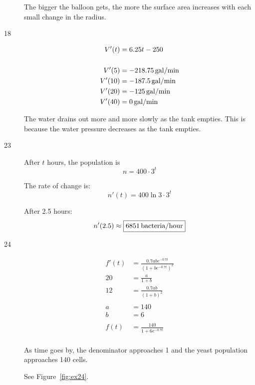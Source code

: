 \documentclass[letterpaper, landscape]{exam}
\begin{document}
\begin{description}
      The bigger the balloon gets, the more the surface area increases with each
      small change in the radius.

    \newpage

    \item[18]
      \begin{align*}
        V'(t)  & = 6.25t - 250 \\
        \\
        V'(5)  & = \unit[-218.75]{gal/min} \\
        V'(10) & = \unit[-187.5]{gal/min} \\
        V'(20) & = \unit[-125]{gal/min} \\
        V'(40) & = \unit[0]{gal/min} \\
      \end{align*}

      The water drains out more and more slowly as the tank empties. This is because
      the water pressure decreases as the tank empties.

    \item[23]
      After $t$ hours, the population is 
      \[
        n = 400 \cdot 3^t 
      \]

      The rate of change is:
      \[
        n'(t) = 400 \ln 3 \cdot 3^t
      \]

      After 2.5 hours:
      \[
        n'(2.5) \approx \boxed{ \unit[6851]{bacteria/hour} }
      \]

    \item[24]
      \begin{align*}
        f'(t) &= \frac{0.7abe^{ - 0.7 t}}{\left( 1 + be^{ - 0.7 t} \right)^2}
        \\
        20 &= \frac{a}{1 + b} \\
        12 &= \frac{0.7 ab}{\left( 1 + b \right)^2} \\
        \\
        a &= 140 \\
        b &= 6 \\
        \\
        f(t) &= \boxed{ \frac{140}{1 + 6 e^{-0.7t}} } \\
      \end{align*}

      As time goes by, the denominator approaches 1 and the yeast population
      approaches 140 cells. 
      
      See Figure~\ref{fig:ex24}.


\end{description}
\end{document}
